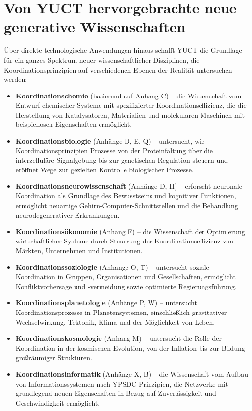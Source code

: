 \documentclass[12pt,a4paper]{article}
\theoremstyle{remark}
\begin{document}
	\section{Von YUCT hervorgebrachte neue generative Wissenschaften}
	\label{sec:generative}
	
	Über direkte technologische Anwendungen hinaus schafft YUCT die Grundlage für ein ganzes Spektrum neuer wissenschaftlicher Disziplinen, die Koordinationsprinzipien auf verschiedenen Ebenen der Realität untersuchen werden:
	
	\begin{itemize}[leftmargin=*]
		\item \textbf{Koordinationschemie} (basierend auf Anhang C) – die Wissenschaft vom Entwurf chemischer Systeme mit spezifizierter Koordinationseffizienz, die die Herstellung von Katalysatoren, Materialien und molekularen Maschinen mit beispiellosen Eigenschaften ermöglicht.
		
		\item \textbf{Koordinationsbiologie} (Anhänge D, E, Q) – untersucht, wie Koordinationsprinzipien Prozesse von der Proteinfaltung über die interzelluläre Signalgebung bis zur genetischen Regulation steuern und eröffnet Wege zur gezielten Kontrolle biologischer Prozesse.
		
		\item \textbf{Koordinationsneurowissenschaft} (Anhänge D, H) – erforscht neuronale Koordination als Grundlage des Bewusstseins und kognitiver Funktionen, ermöglicht neuartige Gehirn-Computer-Schnittstellen und die Behandlung neurodegenerativer Erkrankungen.
		
		\item \textbf{Koordinationsökonomie} (Anhang F) – die Wissenschaft der Optimierung wirtschaftlicher Systeme durch Steuerung der Koordinationseffizienz von Märkten, Unternehmen und Institutionen.
		
		\item \textbf{Koordinationssoziologie} (Anhänge O, T) – untersucht soziale Koordination in Gruppen, Organisationen und Gesellschaften, ermöglicht Konfliktvorhersage und -vermeidung sowie optimierte Regierungsführung.
		
		\item \textbf{Koordinationsplanetologie} (Anhänge P, W) – untersucht Koordinationsprozesse in Planetensystemen, einschließlich gravitativer Wechselwirkung, Tektonik, Klima und der Möglichkeit von Leben.
		
		\item \textbf{Koordinationskosmologie} (Anhang M) – untersucht die Rolle der Koordination in der kosmischen Evolution, von der Inflation bis zur Bildung großräumiger Strukturen.
		
		\item \textbf{Koordinationsinformatik} (Anhänge X, B) – die Wissenschaft vom Aufbau von Informationssystemen nach YPSDC-Prinzipien, die Netzwerke mit grundlegend neuen Eigenschaften in Bezug auf Zuverlässigkeit und Geschwindigkeit ermöglicht.
	\end{itemize}
	
\end{document}
